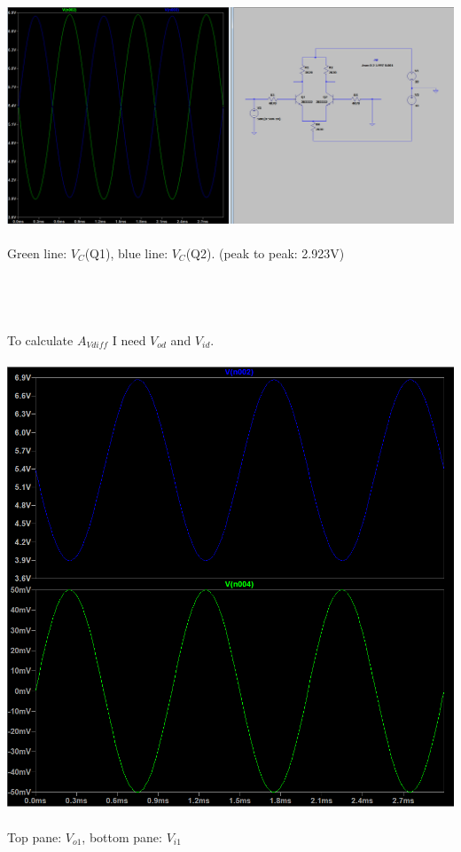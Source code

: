 \documentclass{article}
\begin{document}
\begin{enumerate}
			\includegraphics[scale=0.4]{circuit 2 - coll voltages}\\\\
			Green line: \(V_C\)(Q1), blue line: \(V_C\)(Q2). (peak to peak: 2.923V)\\\\\\\\\\
			To calculate \(A_{Vdiff}\) I need \(V_{od}\) and \(V_{id}\).\\\\
			\includegraphics[scale=0.6]{circuit 2 - adiff}\\\\
			Top pane: \(V_{o1}\), bottom pane: \(V_{i1}\)\\

\end{enumerate}
\end{document}
